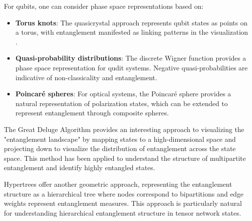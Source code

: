 \documentclass[12pt,a4paper]{article}
\begin{document}
For qubits, one can consider phase space representations based on:
\begin{itemize}
	\item \textbf{Torus knots}: The quasicrystal approach represents qubit states as points on a torus, with entanglement manifested as linking patterns in the visualization \cite{Undermind}.
	\item \textbf{Quasi-probability distributions}: The discrete Wigner function provides a phase space representation for qudit systems. Negative quasi-probabilities are indicative of non-classicality and entanglement.
	\item \textbf{Poincaré spheres}: For optical systems, the Poincaré sphere provides a natural representation of polarization states, which can be extended to represent entanglement through composite spheres.
\end{itemize}

The Great Deluge Algorithm provides an interesting approach to visualizing the "entanglement landscape" by mapping states to a high-dimensional space and projecting down to visualize the distribution of entanglement across the state space. This method has been applied to understand the structure of multipartite entanglement and identify highly entangled states.

Hypertrees offer another geometric approach, representing the entanglement structure as a hierarchical tree where nodes correspond to bipartitions and edge weights represent entanglement measures. This approach is particularly natural for understanding hierarchical entanglement structure in tensor network states.
\end{document}
